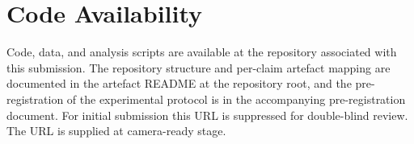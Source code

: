 \FloatBarrier

\section*{Code Availability}

Code, data, and analysis scripts are available at the repository associated with this submission. The repository structure and per-claim artefact mapping are documented in the artefact README at the repository root, and the pre-registration of the experimental protocol is in the accompanying pre-registration document. For initial submission this URL is suppressed for double-blind review. The URL is supplied at camera-ready stage.